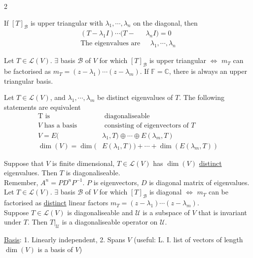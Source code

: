 \documentclass[a4paper,8pt]{extarticle} %
\newcommand{\mybox}[2]{
    \begin{tcolorbox}[colback=lightblue!5!white,colframe=lightblue!75!black,boxsep=1pt,arc=0pt,outer arc=0pt,coltext=black,title={\textcolor{black}{#1}}, before skip=2pt, after skip=2pt]
        #2
    \end{tcolorbox}
}
\begin{document}
\begin{multicols*}{2}
{If $[T]_{\mathcal{B}}$ is upper triangular with $\lambda_1, \cdots, \lambda_n$ on the diagonal, then
\begin{subequations}
    \begin{align}
        (T-\lambda_1 I)\cdots(T-&\lambda_nI)=0\\
        \text{The eigenvalues are}&\text{ $\lambda_1,\cdots,\lambda_n$}
    \end{align}
\end{subequations}

Let $T \in \mathcal{L}(V)$. $\exists$ basis $\mathcal{B}$ of $V$ for which $[T]_{\mathcal{B}}$ is upper triangular $\Leftrightarrow$ $m_T$ can be factorised as $m_T=(z-\lambda_1)\cdots(z-\lambda_m)$. If $\mathbb{F}=\mathbb{C}$, there is always an upper triangular basis.
}

\mybox{Diagonalisation}{
Let $T\in\mathcal{L}(V)$, and $\lambda_1,\cdots,\lambda_m$ be distinct eigenvalues of $T$. The following statements are equivalent
\begin{subequations}
    \begin{align}
        \text{T is}&\text{ diagonaliseable}\\
        V \text{ has a basis}&\text{ consisting of eigenvectors of $T$}\\
        V= E(&\lambda_1, T)\oplus\cdots\oplus E(\lambda_m,T)\\
        \dim(V)=\dim(&E(\lambda_1, T))+\cdots+\dim(E(\lambda_m, T))
    \end{align}
\end{subequations}

Suppose that $V$ is finite dimensional, $T \in \mathcal{L}(V)$ has $\dim(V)$ \underline{distinct} eigenvalues. Then $T$ is diagonaliseable.\\

Remember, $A^n=PD^nP^{-1}$. $P$ is eigenvectors, $D$ is diagonal matrix of eigenvalues.\\

Let $T \in \mathcal{L}(V)$. $\exists$ basis $\mathcal{B}$ of $V$ for which $[T]_{\mathcal{B}}$ is diagonal $\Leftrightarrow$ $m_T$ can be factorised as \underline{distinct} linear factors $m_T=(z-\lambda_1)\cdots(z-\lambda_m)$.\\

Suppose $T\in\mathcal{L}(V)$ is diagonaliseable and $\mathcal{U}$ is a subspace of $V$ that is invariant under $T$. Then $T|_{\mathcal{U}}$ is a diagonaliseable operator on $\mathcal{U}$.
}

\mybox{Other}{
\underline{Basis}: 1. Linearly independent, 2. Spans $V$ (useful: L. I. list of vectors of length $\dim(V)$ is a basis of $V$)\\

}
\end{multicols*}
\end{document}
